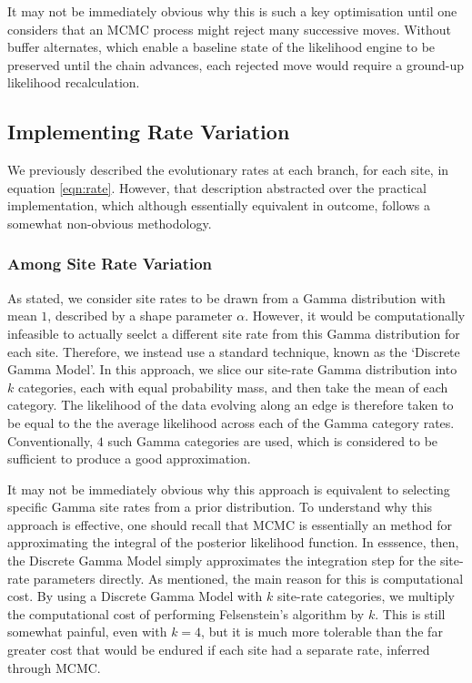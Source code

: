 \documentclass[10pt,journal,compsoc]{IEEEtran}
\begin{document}
It may not be immediately obvious why this is such a key optimisation until one considers that an MCMC process might reject many successive moves. Without buffer alternates, which enable a baseline state of the likelihood engine to be preserved until the chain advances, each rejected move would require a ground-up likelihood recalculation.

\subsection{Implementing Rate Variation}

We previously described the evolutionary rates at each branch, for each site, in equation \eqref{eqn:rate}. However, that description abstracted over the practical implementation, which although essentially equivalent in outcome, follows a somewhat non-obvious methodology.

\subsubsection{Among Site Rate Variation}

As stated, we consider site rates to be drawn from a Gamma distribution with mean $1$, described by a shape parameter $\alpha$. However, it would be computationally infeasible to actually seelct a different site rate from this Gamma distribution for each site. Therefore, we instead use a standard technique, known as the `Discrete Gamma Model'. In this approach, we slice our site-rate Gamma distribution into $k$ categories, each with equal probability mass, and then take the mean of each category. The likelihood of the data evolving along an edge is therefore taken to be equal to the the average  likelihood across each of the Gamma category rates. Conventionally, $4$ such Gamma categories are used, which is considered to be sufficient to produce a good approximation.

It may not be immediately obvious why this approach is equivalent to selecting specific Gamma site rates from a prior distribution. To understand why this approach is effective, one should recall that MCMC is essentially an method for approximating the integral of the posterior likelihood function. In esssence, then, the Discrete Gamma Model simply approximates the integration step for the site-rate parameters directly. As mentioned, the main reason for this is computational cost. By using a Discrete Gamma Model with $k$ site-rate categories, we multiply the computational cost of performing Felsenstein's algorithm by $k$. This is still somewhat painful, even with $k=4$, but it is much more tolerable than the far greater cost that would be endured if each site had a separate rate, inferred through MCMC.
\end{document}
